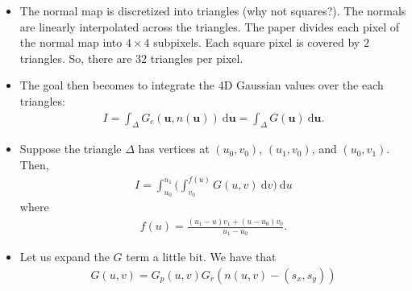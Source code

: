 \documentclass[10pt]{article}
\newcommand{\dee}{\mathrm{d}}
\newcommand{\ve}[1]{\mathbf{#1}}
\begin{document}
  \begin{itemize}
  	\item The normal map is discretized into triangles (why not squares?).  The normals are linearly interpolated across the triangles.  The paper divides each pixel of the normal map into $4 \times 4$ subpixels.  Each square pixel is covered by $2$ triangles.  So, there are $32$ triangles per pixel.

  	\item The goal then becomes to integrate the 4D Gaussian values over the each triangles:
  	\begin{align*}
  		I = \int_{\Delta} G_c(\ve{u}, n(\ve{u}))\ \dee\ve{u} = \int_{\Delta} G(\ve{u})\ \dee\ve{u}.
  	\end{align*}

  	\item Suppose the triangle $\Delta$ has vertices at $(u_0, v_0)$, $(u_1, v_0)$, and $(u_0, v_1)$.  Then,
  	\begin{align*}
  		I = \int_{u_0}^{u_1} \bigg( \int_{v_0}^{f(u)}G(u,v)\ \dee v \bigg)\ \dee u
  	\end{align*}
  	where
  	\begin{align*}
  		f(u) = \frac{(u_1-u)v_1 + (u - u_0)v_0}{u_1 - u_0}.
  	\end{align*}

  	\item Let us expand the $G$ term a little bit.  We have that
  	\begin{align*}
  		G(u,v) = G_p(u,v) G_r(n(u,v) - (s_x, s_y))
  	\end{align*}
  \end{itemize}

  
    
\end{document}
